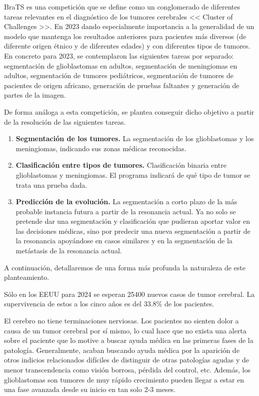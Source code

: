 BraTS es una competición que se define como un conglomerado de diferentes tareas relevantes en el diagnóstico de los tumores cerebrales << Cluster of Challenges >>. En 2023 dando especialmente importancia a la generalidad de un modelo que mantenga los resultados anteriores para pacientes más diversos (de diferente origen étnico y de diferentes edades) y con diferentes tipos de tumores. En concreto para 2023, se contemplaron las siguientes tareas por separado: segmentación de glioblastomas en adultos, segmentación de meningiomas en adultos, segmentación de tumores pediátricos, segmentación de tumores de pacientes de origen africano, generación de pruebas faltantes y generación de partes de la imagen.

De forma análoga a esta competición, se plantea conseguir dicho objetivo a partir de la resolución de las siguientes tareas.

\begin{enumerate}
	\item \textbf{Segmentación de los tumores.} 
	La segmentación de los glioblastomas y los meningiomas, indicando sus zonas médicas reconocidas.
	\item \textbf{Clasificación entre tipos de tumores.} Clasificación binaria entre glioblastomas y meningiomas. El programa indicará de qué tipo de tumor se trata una prueba dada.
	\item \textbf{Predicción de la evolución.} La segmentación a corto plazo de la más probable instancia futura a partir de la resonancia actual. Ya no solo se pretende dar una segmentación y clasificación que pudieran aportar valor en las decisiones médicas, sino por predecir una nueva segmentación a partir de la resonancia apoyándose en casos similares y en la segmentación de la metástasis de la resonancia actual.
\end{enumerate}

A continuación, detallaremos de una forma más profunda la naturaleza de este planteamiento.

Sólo en los EEUU para 2024 se esperan 25400 nuevos casos de tumor cerebral. La supervivencia de estos a los cinco años es del $33.8 \%$ de los pacientes. \cite{cancerorg}

El cerebro no tiene terminaciones nerviosas. Los pacientes no sienten dolor a causa de un tumor cerebral por sí mismo, lo cual hace que no exista una alerta sobre el paciente que lo motive a buscar ayuda médica en las primeras fases de la patología. Generalmente, acaban buscando ayuda médica por la aparición de otros indicios relacionados difíciles de distinguir de otras patologías agudas y de menor transcendencia como visión borrosa, pérdida del control, etc. Además, los glioblastomas son tumores de muy rápido crecimiento pueden llegar a estar en una fase avanzada desde su inicio en tan solo 2-3 meses.

